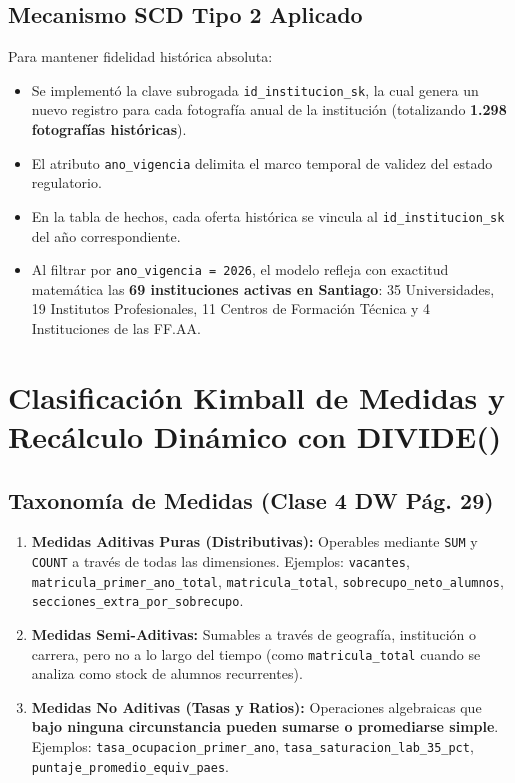 \documentclass[11pt,a4paper]{article}
\begin{document}
\subsection{Mecanismo SCD Tipo 2 Aplicado}
Para mantener fidelidad histórica absoluta:
\begin{itemize}
    \item Se implementó la clave subrogada \texttt{id\_institucion\_sk}, la cual genera un nuevo registro para cada fotografía anual de la institución (totalizando \textbf{1.298 fotografías históricas}).
    \item El atributo \texttt{ano\_vigencia} delimita el marco temporal de validez del estado regulatorio.
    \item En la tabla de hechos, cada oferta histórica se vincula al \texttt{id\_institucion\_sk} del año correspondiente.
    \item Al filtrar por \texttt{ano\_vigencia = 2026}, el modelo refleja con exactitud matemática las \textbf{69 instituciones activas en Santiago}: 35 Universidades, 19 Institutos Profesionales, 11 Centros de Formación Técnica y 4 Instituciones de las FF.AA.
\end{itemize}

\section{Clasificación Kimball de Medidas y Recálculo Dinámico con DIVIDE()}

\subsection{Taxonomía de Medidas (Clase 4 DW Pág. 29)}
\begin{enumerate}
    \item \textbf{Medidas Aditivas Puras (Distributivas):} Operables mediante \texttt{SUM} y \texttt{COUNT} a través de todas las dimensiones. Ejemplos: \texttt{vacantes}, \texttt{matricula\_primer\_ano\_total}, \texttt{matricula\_total}, \texttt{sobrecupo\_neto\_alumnos}, \texttt{secciones\_extra\_por\_sobrecupo}.
    \item \textbf{Medidas Semi-Aditivas:} Sumables a través de geografía, institución o carrera, pero no a lo largo del tiempo (como \texttt{matricula\_total} cuando se analiza como stock de alumnos recurrentes).
    \item \textbf{Medidas No Aditivas (Tasas y Ratios):} Operaciones algebraicas que \textbf{bajo ninguna circunstancia pueden sumarse o promediarse simple}. Ejemplos: \texttt{tasa\_ocupacion\_primer\_ano}, \texttt{tasa\_saturacion\_lab\_35\_pct}, \texttt{puntaje\_promedio\_equiv\_paes}.
\end{enumerate}
\end{document}
